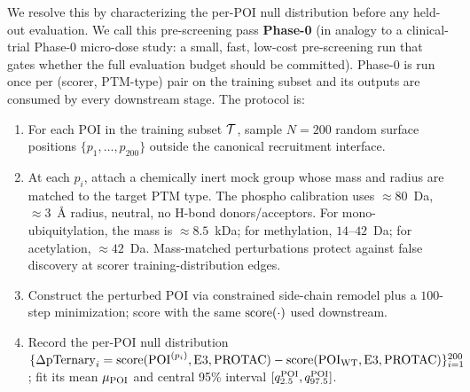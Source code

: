 We resolve this by characterizing the per-POI null distribution before any held-out evaluation. We call this pre-screening pass \textbf{Phase-0} (in analogy to a clinical-trial Phase-0 micro-dose study: a small, fast, low-cost pre-screening run that gates whether the full evaluation budget should be committed). Phase-0 is run once per (scorer, PTM-type) pair on the training subset and its outputs are consumed by every downstream stage. The protocol is:
\begin{enumerate}[leftmargin=*,itemsep=2pt,topsep=2pt]
\item For each POI in the training subset $\mathcal{T}$, sample $N{=}200$ random surface positions $\{p_1,\dots,p_{200}\}$ outside the canonical recruitment interface.
\item At each $p_i$, attach a chemically inert mock group whose mass and radius are matched to the target PTM type. The phospho calibration uses $\approx 80$~Da, $\approx 3$~\AA{} radius, neutral, no H-bond donors/acceptors. For mono-ubiquitylation, the mass is $\approx 8.5$~kDa; for methylation, $14$--$42$~Da; for acetylation, $\approx 42$~Da. Mass-matched perturbations protect against false discovery at scorer training-distribution edges.
\item Construct the perturbed POI via constrained side-chain remodel plus a $100$-step minimization; score with the same $\mathrm{score}(\cdot)$ used downstream.
\item Record the per-POI null distribution $\{\Delta\mathrm{pTernary}_i = \mathrm{score}(\mathrm{POI}^{(p_i)},\mathrm{E3},\mathrm{PROTAC}) - \mathrm{score}(\mathrm{POI}_{\mathrm{WT}},\mathrm{E3},\mathrm{PROTAC})\}_{i=1}^{200}$; fit its mean $\mu_{\mathrm{POI}}$ and central 95\% interval $[q_{2.5}^{\mathrm{POI}},q_{97.5}^{\mathrm{POI}}]$.
\end{enumerate}

